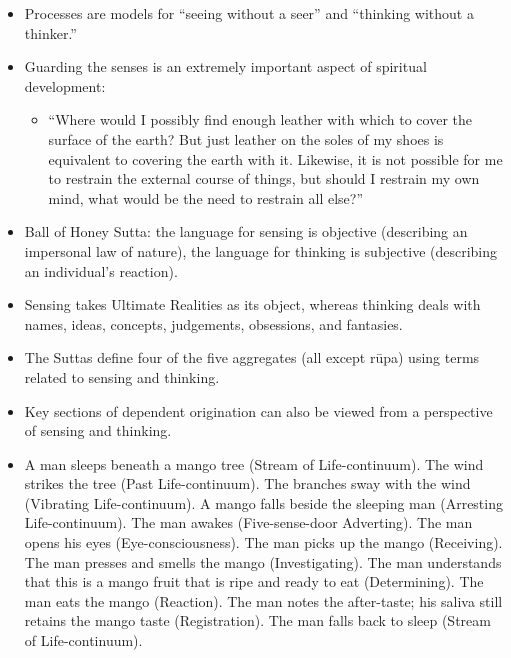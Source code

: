 \begin{itemize}

\item Processes are models for “seeing without a seer” and “thinking without a thinker.”

\item Guarding the senses is an extremely important aspect of spiritual development:

\begin{itemize}

\item “Where would I possibly find enough leather with which to cover the surface of the earth? But just leather on the soles of my shoes is equivalent to covering the earth with it. Likewise, it is not possible for me to restrain the external course of things, but should I restrain my own mind, what would be the need to restrain all else?”

\end{itemize}

\item Ball of Honey Sutta: the language for sensing is objective (describing an impersonal law of nature), the language for thinking is subjective (describing an individual’s reaction).

\item Sensing takes Ultimate Realities as its object, whereas thinking deals with names, ideas, concepts, judgements, obsessions, and fantasies.

\item The Suttas define four of the five aggregates (all except rūpa) using terms related to sensing and thinking.

\item Key sections of dependent origination can also be viewed from a perspective of sensing and thinking.

\item A man sleeps beneath a mango tree (Stream of Life-continuum). The wind strikes the tree (Past Life-continuum). The branches sway with the wind (Vibrating Life-continuum). A mango falls beside the sleeping man (Arresting Life-continuum). The man awakes (Five-sense-door Adverting). The man opens his eyes (Eye-consciousness). The man picks up the mango (Receiving). The man presses and smells the mango (Investigating). The man understands that this is a mango fruit that is ripe and ready to eat (Determining). The man eats the mango (Reaction). The man notes the after-taste; his saliva still retains the mango taste (Registration). The man falls back to sleep (Stream of Life-continuum).


\end{itemize}
